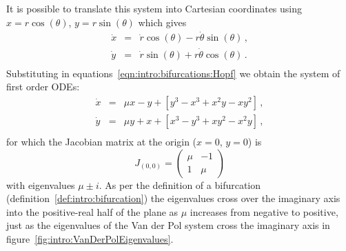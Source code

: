 {{	It is possible to translate this system into Cartesian coordinates using $x=r\cos(\theta)$, $y=r\sin(\theta)$ which gives 
		\begin{equation}
			\begin{array}{rcl}
				\dot{x} &=& \dot{r}\cos(\theta) - r\dot{\theta}\sin(\theta)\,,\\
				\dot{y} &=&  \dot{r}\sin(\theta) + r\dot{\theta}\cos(\theta)\,.\\
			\end{array}
		\end{equation}
		Substituting in equations~\ref{eqn:intro:bifurcations:Hopf} we obtain the system of first order ODEs:
		\begin{equation}
			\begin{array}{rcl}
				\dot{x} &=& \mu x - y + \left[y^3 - x^3 + x^2 y - x y^2 \right]\,,\\
				\dot{y} &=& \mu y + x + \left[x^3 - y^3 + x y^2 - x^2 y \right]\,, \\
			\end{array}
		\end{equation}
		for which the Jacobian matrix at the origin ($x=0$, $y=0$) is 
		\begin{equation}
		J_{(0,0)} = \begin{pmatrix}
			\mu & -1\\
			1   & \mu
		\end{pmatrix}
		\end{equation}
		with eigenvalues $\mu\pm i$. As per the definition of a bifurcation (definition~\ref{def:intro:bifurcation}) the eigenvalues cross over the imaginary axis into the positive-real half of the plane as $\mu$ increases from negative to positive, just as the eigenvalues of the Van der Pol system cross the imaginary axis in figure~\ref{fig:intro:VanDerPolEigenvalues}.
}}




